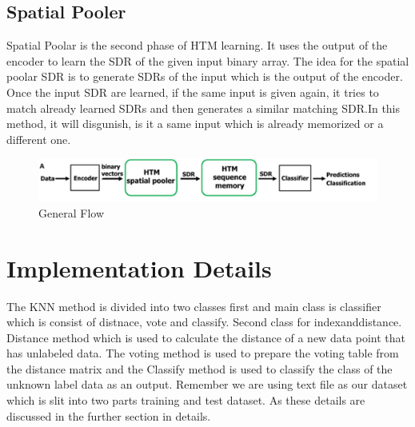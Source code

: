\documentclass[conference]{IEEEtran}
\begin{document}
\subsection{Spatial Pooler}
Spatial Poolar is the second phase of HTM learning. It uses the output of the encoder to learn the SDR of the given input binary array. The idea for the spatial poolar SDR is to generate SDRs of the input which is the output of the encoder. Once the input SDR are learned, if the same input is given again, it tries to match already learned SDRs and then generates a similar matching SDR.In this method, it will disgunish, is it a same input which is already memorized or a different one.   


\begin{figure}[h]
\includegraphics[scale=.40]{HtmPipeline.png}
\caption{General Flow}
\label{fig:enter-label}
\end{figure}






\section{Implementation Details}
The KNN method is divided into two classes first and main class is classifier which is consist of distnace, vote and classify. Second class for indexanddistance. Distance method which is used to calculate the distance of a new data point that has unlabeled data. The voting method is used to prepare the voting table from the distance matrix and the Classify method is used to classify the class of the unknown label data as an output. Remember we are using text file as our dataset which is slit into two parts training and test dataset. As these details are discussed in the further section in details. 
\end{document}
